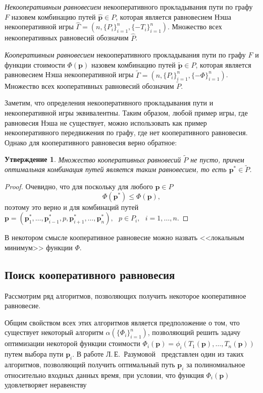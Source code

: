 \documentclass[12pt, a4paper]{article}
\newtheorem{state}{Утверждение}[section]
\begin{document}
\textit{Некооперативным равновесием} некооперативного прокладывания пути по графу $F$ назовем комбинацию путей $\widehat{\textbf{p}} \in P$, которая является равновесием Нэша некооперативной игры $\widehat{\Gamma} = (n, \{P_i\}_{i = 1}^n, \{-T_i\}_{i = 1}^n)$. Множество всех некооперативных равновесий обозначим $\widehat{P}$.

\textit{Кооперативным равновесием} некооперативного прокладывания пути по графу $F$ и функции стоимости $\Phi (\textbf{p})$ назовем комбинацию путей $\widetilde{\textbf{p}} \in P$, которая является равновесием Нэша некооперативной игры $\widetilde{\Gamma} = (n, \{P_i\}_{i = 1}^n, \{-\Phi\}_{i = 1}^n)$. Множество всех кооперативных равновесий обозначим $\widetilde{P}$.

Заметим, что определения некооперативного прокладывания пути и некооперативной игры эквивалентны.  
Таким образом, любой пример игры, где равновесия Нэша не существует, можно использовать как пример некооперативного передвижения по графу, где нет кооперативного равновесия.
Однако для кооперативного равновесия верно обратное:

\begin{state}
Множество кооперативных равновесий $\widetilde{P}$ не пусто, причем
оптимальная комбинация путей является таким равновесием, то есть $\textbf{p}^* \in \widetilde{P}$.
\end{state}

\begin{proof}
	Очевидно, что для поскольку для любого $\textbf{p} \in P$ 
	$$\Phi (\textbf{p}^*) \le \Phi (\textbf{p}),$$
	поэтому это верно и для комбинаций путей $\textbf{p} = \left(\textbf{p}^*_1, \ldots, \textbf{p}^*_{i - 1}, p, \textbf{p}^*_{i + 1}, \ldots, \textbf{p}^*_{n} \right), \text{ } p \in P_i, \text{ } i = 1, \ldots, n$.
\end{proof}

В некотором смысле кооперативное равновесие можно назвать <<локальным минимум>> функции $\Phi$.

\subsection{Поиск кооперативного равновесия}
Рассмотрим ряд алгоритмов, позволяющих получить некоторое кооперативное равновесие.

Общим свойством всех этих алгоритмов является предположение о том, что существует некоторый алгоритм $\alpha (\{\Phi_i\}_{i = 1}^n)$, позволяющий решить задачу оптимизации некоторой функции стоимости $\Phi_i (\textbf{p}) = \phi_i(T_1(\textbf{p}), \ldots, T_n(\textbf{p}))$ путем выбора пути $\textbf{p}_i$. В работе Л.\,Е.~Разумовой~\cite{Luba} представлен один из таких алгоритмов, позволяющий получить оптимальный путь $\textbf{p}_i$ за полиномиальное относительно входных данных время, при условии, что функция $\Phi_i (\textbf{p})$ удовлетворяет неравенству
\end{document}
